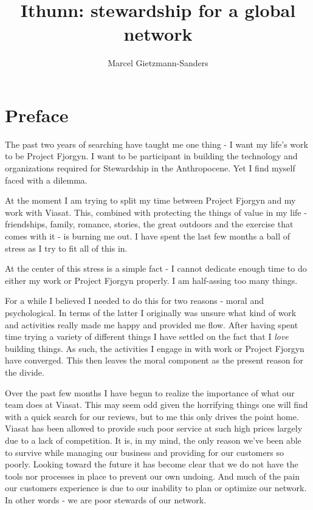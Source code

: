 \documentclass[10pt,a5paper]{book}
\title{Ithunn: stewardship for a global network}
\author{Marcel Gietzmann-Sanders}
\begin{document}
\maketitle
\tableofcontents
\newpage
\chapter*{Preface}
The past two years of searching have taught me one thing - I want my life's work to be Project Fjorgyn. I want to be participant in building the technology and organizations required for Stewardship in the Anthropocene. Yet I find myself faced with a dilemma. 

At the moment I am trying to split my time between Project Fjorgyn and my work with Viasat. This, combined with protecting the things of value in my life - friendships, family, romance, stories, the great outdoors and the exercise that comes with it - is burning me out. I have spent the last few months a ball of stress as I try to fit all of this in. 

At the center of this stress is a simple fact - I cannot dedicate enough time to do either my work or Project Fjorgyn properly. I am half-assing too many things. 

For a while I believed I needed to do this for two reasons - moral and psychological. In terms of the latter I originally was unsure what kind of work and activities really made me happy and provided me flow. After having spent time trying a variety of different things I have settled on the fact that I \textit{love} building things. As such, the activities I engage in with work or Project Fjorgyn have converged. This then leaves the moral component as the present reason for the divide. 

Over the past few months I have begun to realize the importance of what our team does at Viasat. This may seem odd given the horrifying things one will find with a quick search for our reviews, but to me this only drives the point home. Viasat has been allowed to provide such poor service at such high prices largely due to a lack of competition. It is, in my mind, the only reason we've been able to survive while managing our business and providing for our customers so poorly. Looking toward the future it has become clear that we do not have the tools nor processes in place to prevent our own undoing. And much of the pain our customers experience is due to our inability to plan or optimize our network. In other words - we are poor stewards of our network. 
\end{document}
